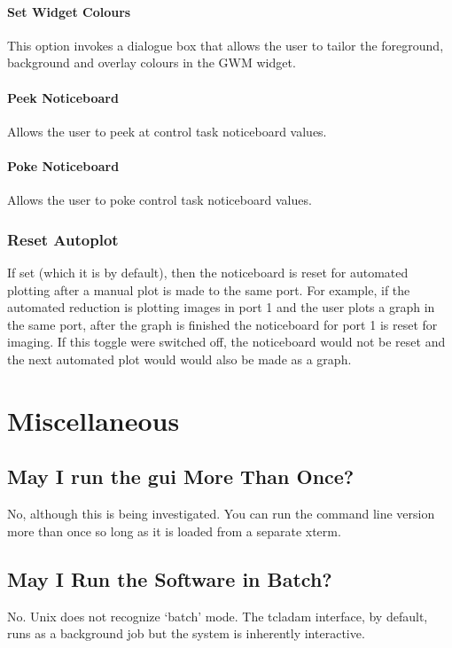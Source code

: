 \documentclass[a4paper]{book}
\newcommand{\stardocinitials}  {SUN}
\newcommand{\stardocnumber}    {27.5}
\newcommand{\stardocname}{\stardocinitials /\stardocnumber}
\renewcommand{\_}{{\tt\char'137}}
\begin{document}
\subsubsection{Set Widget Colours}
This option invokes a dialogue box that allows the user to tailor the foreground,
background and overlay colours in the GWM widget.

\subsubsection{Peek Noticeboard}
Allows the user to peek at control task noticeboard values.

\subsubsection{Poke Noticeboard}
Allows the user to poke control task noticeboard values.

\subsection{Reset Autoplot}
If set (which it is by default), then the noticeboard is reset for automated plotting
after a manual plot is made to the same port. For example, if the automated reduction
is plotting images in port 1 and the user plots a graph in the same port, after the
graph is finished the noticeboard for port 1 is reset for imaging. If this toggle were
switched off, the noticeboard would not be reset and the next automated plot would would
also be made as a graph.

\chapter{Miscellaneous}
\markboth{Miscellaneous}{\stardocname}
\section{May I run the {\sc gui} More Than Once?}
No, although this is being investigated. You can run the command line version more than
once so long as it is loaded from a separate xterm.

\section{May I Run the Software in Batch?}
No. Unix does not recognize `batch' mode. The {\sc tcladam} interface, by default,
runs as a background job but the system is inherently interactive.
\end{document}
